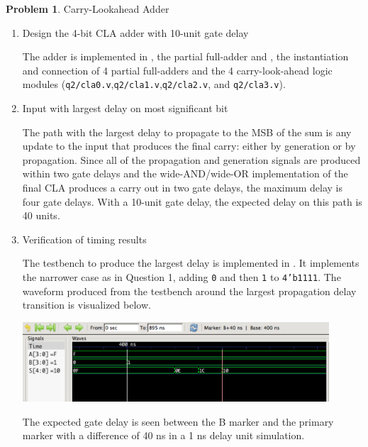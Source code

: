 \documentclass[10pt]{article}
\theoremstyle{definition}
\newtheorem{problem}{Problem}
\begin{document}
  \newpage

  \begin{problem}
    Carry-Lookahead Adder

    \begin{enumerate}
      \item Design the 4-bit CLA adder with 10-unit gate delay

      The adder is implemented in \texttt{}, the partial full-adder and \texttt{}, the instantiation and connection of 4 partial full-adders and the 4 carry-look-ahead logic modules (\texttt{q2/cla0.v},\texttt{q2/cla1.v},\texttt{q2/cla2.v}, and \texttt{q2/cla3.v}).

      \item Input with largest delay on most significant bit

      The path with the largest delay to propagate to the MSB of the sum is any update to the input that produces the final carry: either by generation or by propagation. Since all of the propagation and generation signals are produced within two gate delays and the wide-AND/wide-OR implementation of the final CLA produces a carry out in two gate delays, the maximum delay is four gate delays. With a 10-unit gate delay, the expected delay on this path is 40 units.

      \item Verification of timing results

      The testbench to produce the largest delay is implemented in \texttt{}. It implements the narrower case as in Question 1, adding \texttt{0} and then \texttt{1} to \texttt{4'b1111}. The waveform produced from the testbench around the largest propagation delay transition is visualized below.

      \includegraphics*[width=0.9\textwidth] {adder_cla_4_propagation-screenshot.png}

      The expected gate delay is seen between the B marker and the primary marker with a difference of 40 ns in a 1 ns delay unit simulation.

    \end{enumerate}
  \end{problem}
\end{document}
